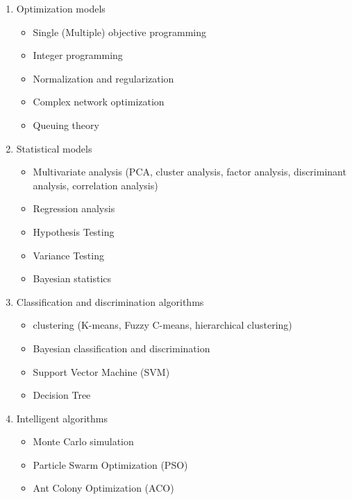 \documentclass[12pt]{article}  %
\begin{document}
\begin{enumerate}[(1)]
 \item Optimization models
 \begin{itemize}
     \setlength{\parsep}{0ex} %
     \setlength{\topsep}{2ex} %
     \setlength{\itemsep}{1ex} %
     \item Single  (Multiple) objective programming
     \item Integer programming
     \item Normalization and regularization
     \item Complex network optimization
     \item Queuing theory
 \end{itemize}
 \item Statistical models
 \begin{itemize}
     \setlength{\parsep}{0ex} %
     \setlength{\topsep}{2ex} %
     \setlength{\itemsep}{1ex} %
     \item Multivariate analysis (PCA, cluster analysis, factor analysis, discriminant analysis, correlation analysis)
     \item Regression analysis
     \item Hypothesis Testing
     \item Variance Testing
     \item Bayesian statistics
 \end{itemize}
 \item Classification and discrimination algorithms
 \begin{itemize}
     \setlength{\parsep}{0ex} %
     \setlength{\topsep}{2ex} %
     \setlength{\itemsep}{1ex} %
     \item clustering (K-means, Fuzzy C-means, hierarchical clustering)
     \item Bayesian classification and discrimination
     \item Support Vector Machine (SVM)
     \item Decision Tree
 \end{itemize}
 \item Intelligent algorithms
 \begin{itemize}
     \setlength{\parsep}{0ex} %
     \setlength{\topsep}{2ex} %
     \setlength{\itemsep}{1ex} %
     \item Monte Carlo simulation
     \item Particle Swarm Optimization (PSO)
     \item Ant Colony Optimization (ACO)

\end{itemize}
\end{enumerate}
\end{document}
